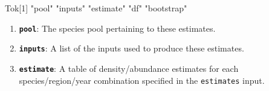 \documentclass[
]{book}
\newenvironment{Shaded}{\begin{snugshade}}{\end{snugshade}}
\newcommand{\DecValTok}[1]{\textcolor[rgb]{0.00,0.00,0.81}{#1}}
\newcommand{\NormalTok}[1]{#1}
\newcommand{\StringTok}[1]{\textcolor[rgb]{0.31,0.60,0.02}{#1}}
\begin{document}
\begin{Shaded}
\begin{Highlighting}[]
Tok{[}\DecValTok{1}\NormalTok{] }\StringTok{"pool"}      \StringTok{"inputs"}    \StringTok{"estimate"}  \StringTok{"df"}        \StringTok{"bootstrap"}
\end{Highlighting}
\end{Shaded}

\begin{enumerate}
\def\labelenumi{(\arabic{enumi})}
\item
  \textbf{\texttt{pool}}: The species pool pertaining to these estimates.
\item
  \textbf{\texttt{inputs}}: A list of the inputs used to produce these estimates.
\item
  \textbf{\texttt{estimate}}: A table of density/abundance estimates for each species/region/year combination specified in the \texttt{estimates} input.
\end{enumerate}
\end{document}
